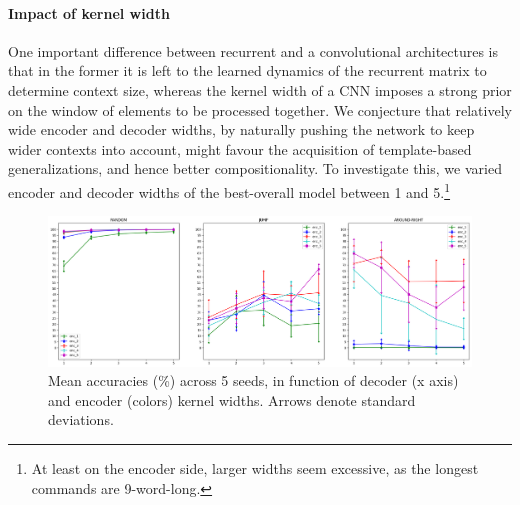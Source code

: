 \paragraph{Impact of kernel width}
\label{subsec:exp2}

One important difference between recurrent and a convolutional
architectures is that in the former it is left to the learned dynamics
of the recurrent matrix to determine context size, whereas the kernel
width of a CNN imposes a strong prior on the window of elements to be
processed together. We conjecture that relatively wide encoder and
decoder widths, by naturally pushing the network to keep wider
contexts into account, might favour the acquisition of template-based
generalizations, and hence better compositionality. To investigate
this, we varied encoder and decoder widths of the best-overall model
between 1 and 5.\footnote{At least on the encoder side, larger widths
  seem excessive, as the longest commands are 9-word-long.}


\begin{figure}[tb]
    \centering
    \includegraphics[width=\textwidth,keepaspectratio]{figures/kernel_exp.png}
    \caption{Mean accuracies (\%) across 5 seeds, in function of decoder (x axis) and encoder (colors) kernel widths. Arrows denote standard deviations.
    }
    \label{fig:kernel_exp}
\end{figure}


